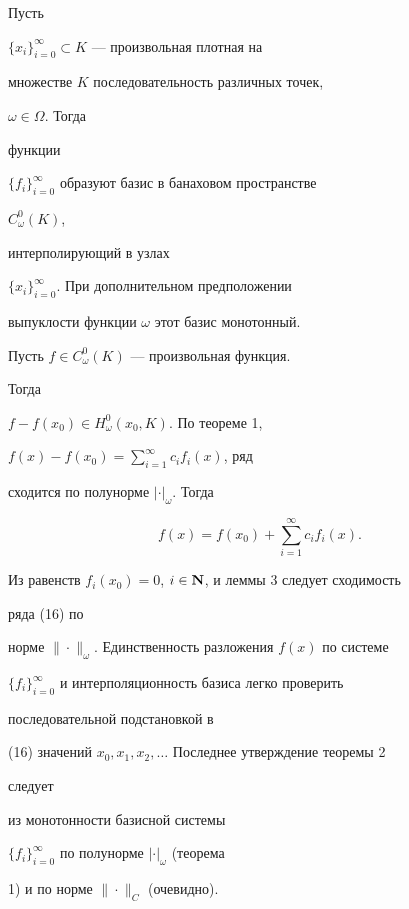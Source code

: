 \begin{thm} Пусть


$\{x_i\}^\infty_{i=0}\subset K$ --- произвольная плотная на


множестве $K$ последовательность различных точек,


$\omega\in\Omega$. Тогда


функции


$\{f_i\}^\infty_{i=0}$ образуют базис в банаховом пространстве


$C^0_\omega(K)$,


интерполирующий в узлах


$\{x_i\}^\infty_{i=0}$. При дополнительном предположении


выпуклости функции $\omega$ этот базис монотонный.


\end{thm}





\begin{pf} Пусть $f\in C^0_\omega(K)$ --- произвольная функция.


Тогда


$f-f(x_0)\in H^0_\omega(x_0,K)$. По теореме 1,


$f(x)-f(x_0)=\sum\limits^\infty_{i=1}c_i f_i(x)$, ряд


сходится по полунорме $|\cdot|_\omega$. Тогда


\begin{equation}


f(x)=f(x_0)+\sum^\infty_{i=1}c_i f_i(x).


\end{equation}


Из равенств $f_i(x_0)=0$, $i\in\bold N$, и леммы 3 следует сходимость


ряда (16) по


норме $\|\cdot\|_\omega$. Единственность разложения $f(x)$ по системе


$\{f_i\}^\infty_{i=0}$ и интерполяционность базиса легко проверить


последовательной подстановкой в


(16) значений $x_0,x_1,x_2,\dotsc$ Последнее утверждение теоремы 2


следует


из монотонности базисной системы


$\{f_i\}^\infty_{i=0}$ по полунорме $|\cdot|_\omega$ (теорема


1) и по норме $\|\cdot\|_C$ (очевидно).


\end{pf}





